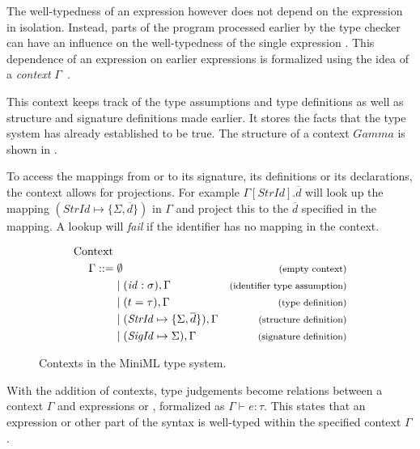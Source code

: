 The well-typedness of an expression  however does not depend on the expression  in isolation.
Instead, parts of the program processed earlier by the type checker can have an influence on the well-typedness of the single expression .
This dependence of an expression  on earlier expressions is formalized using the idea of a \emph{context} $\Gamma$~\cite{Pierce}. 

This context keeps track of the type assumptions and type definitions as well as structure and signature definitions made earlier.
It stores the facts that the type system has already established to be true.
The structure of a context $Gamma$ is shown in .

To access the mappings from  or  to its signature, its definitions or its declarations, the context allows for projections. For example $\Gamma[\mathit{StrId}].\overline{d}$ will look up the mapping $(\mathit{StrId} \mapsto \lbrace \Sigma,\overline{d}\rbrace)$ in $\Gamma$ and project this to the $\overline{d}$ specified in the mapping. A lookup will \emph{fail} if the identifier has no mapping in the context.

\begin{figure}[!htb]
\begin{align*}
\begin{aligned}
\text{Context }\\
\Gamma ::=\; &\emptyset     & \footnotesize\text{(empty context)}\\
&| \; (\mathit{id}:\sigma),\Gamma          & \footnotesize\text{(identifier type assumption)}\\
&| \; (t = \tau), \Gamma                   & \footnotesize\text{(type definition)}\\
&| \; (\mathit{StrId} \mapsto \lbrace \Sigma,\overline{d}\rbrace), \Gamma 
                                           & \footnotesize\text{(structure definition)}\\
&| \; (\mathit{SigId} \mapsto \Sigma), \Gamma
                                           & \footnotesize\text{(signature definition)}
\end{aligned}
\end{align*}
\caption[Contexts]{Contexts in the MiniML type system.}
\label{fig:MiniMLContexts}
\end{figure}

With the addition of contexts, type judgements become relations between a context $\Gamma$ and expressions  or , formalized as $\Gamma \vdash e:\tau$.
This states that an expression or other part of the syntax is well-typed within the specified context $\Gamma$.

